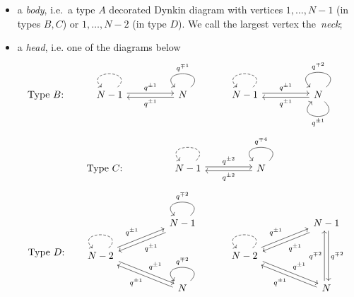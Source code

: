 \documentclass{amsart}
\begin{document}
\begin{itemize}[leftmargin=0.7cm]
	
\item a \emph{body}, i.e.\ a type $A$ decorated Dynkin diagram with vertices $1,\dots,N-1$ (in types $B,C$) or $1,\dots,N-2$ (in type $D$). We call the largest vertex the~\emph{neck};
	
\medskip 
	
\item a \emph{head}, i.e. one of the diagrams below
\begin{equation}
\label{eqn:type b head}
\text{Type $B$:} \qquad 
\begin{tikzcd}
N-1 && N
\arrow["q^{\pm 1}", shift left=2pt, from=1-3, to=1-1]
\arrow["q^{\pm 1}", shift left=2pt, from=1-1, to=1-3]
\arrow["q^{\mp 1}"',  from=1-3, to=1-3, looseness=4]
\arrow[dashed, from=1-1, to=1-1, looseness=4]
\end{tikzcd} \quad \begin{tikzcd}
N-1 && N 
\arrow["q^{\pm 1}", shift left=2pt, from=1-3, to=1-1]
\arrow["q^{\pm 1}", shift left=2pt, from=1-1, to=1-3]
\arrow["q^{\mp 2}"', from=1-3, to=1-3, out=45, in=135, distance=10mm]
\arrow["q^{\pm 1}", from=1-3, to=1-3, out=315, in=225, distance=10mm]
\arrow[dashed, from=1-1, to=1-1, looseness=4]
\end{tikzcd}
\end{equation}
\begin{equation}
\label{eqn:type c head}
\text{Type $C$:} \qquad \qquad
\begin{tikzcd}
N-1 && N
\arrow["q^{\pm 2}", shift left=2pt, from=1-3, to=1-1]
\arrow["q^{\pm 2}", shift left=2pt, from=1-1, to=1-3]
\arrow["q^{\mp 4}"', from=1-3, to=1-3, looseness=4]
\arrow[dashed, from=1-1, to=1-1, looseness=4]
\end{tikzcd} 
\end{equation}
\begin{equation}
\label{eqn:type d head}
\text{Type $D$:} \quad 
\begin{tikzcd}
&& {N-1} \\
{N-2} \\
&& N
\arrow["q^{\pm 1}", shift left=2pt, from=2-1, to=1-3]
\arrow["q^{\pm 1}", shift left=2pt, from=1-3, to=2-1]
\arrow["q^{\pm 1}", shift left=2pt, from=2-1, to=3-3]
\arrow["q^{\pm 1}", shift left=2pt, from=3-3, to=2-1]
\arrow["q^{\mp 2}", swap, from=1-3, to=1-3, looseness=4]
\arrow["q^{\mp 2}", swap, from=3-3, to=3-3, looseness=4]
\arrow[dashed, from=2-1, to=2-1, looseness=4]
\end{tikzcd} \quad \begin{tikzcd}
&& {N-1} \\
{N-2} \\
&& N
\arrow["q^{\pm 1}", shift left=2pt, from=2-1, to=1-3]
\arrow["q^{\pm 1}", shift left=2pt, from=1-3, to=2-1]
\arrow["q^{\pm 1}", shift left=2pt, from=2-1, to=3-3]
\arrow["q^{\pm 1}", shift left=2pt, from=3-3, to=2-1]
\arrow["{q^{\mp 2}}", shift left=2pt, from=1-3, to=3-3]
\arrow["{q^{\mp 2}}", shift left=2pt, from=3-3, to=1-3]
\arrow[dashed, from=2-1, to=2-1, looseness=4]
\end{tikzcd}
\end{equation}

\end{itemize} 
\end{document}
